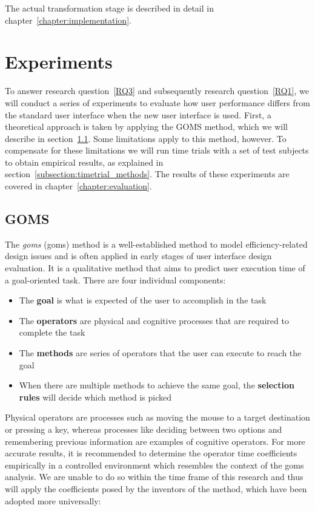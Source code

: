 The actual transformation stage is described in detail in chapter~\ref{chapter:implementation}.

\section{Experiments}
\label{section:experiments_methods}
To answer research question~\ref{RQ3} and subsequently research question~\ref{RQ1}, we will conduct a series of experiments to evaluate how user performance differs from the standard user interface when the new user interface is used. First, a theoretical approach is taken by applying the GOMS method, which we will describe in section~\ref{subsection:goms_methods}. Some limitations apply to this method, however. To compensate for these limitations we will run time trials with a set of test subjects to obtain empirical results, as explained in section~\ref{subsection:timetrial_methods}. The results of these experiments are covered in chapter~\ref{chapter:evaluation}.

\subsection{GOMS}
\label{subsection:goms_methods}
The \textit{\acrlong{goms}} (\acrshort{goms}) method is a well-established method to model efficiency-related design issues and is often applied in early stages of user interface design evaluation\cite{schrepp1990goms, john1996goms, kieras1994goms}. It is a qualitative method that aims to predict user execution time of a goal-oriented task. There are four individual components:

\begin{itemize}
	\item The \textbf{goal} is what is expected of the user to accomplish in the task
	\item The \textbf{operators} are physical and cognitive processes that are required to complete the task
	\item The \textbf{methods} are series of operators that the user can execute to reach the goal
	\item When there are multiple methods to achieve the same goal, the \textbf{selection rules} will decide which method is picked
\end{itemize}

Physical operators are processes such as moving the mouse to a target destination or pressing a key, whereas processes like deciding between two options and remembering previous information are examples of cognitive operators. For more accurate results, it is recommended to determine the operator time coefficients empirically in a controlled environment which resembles the context of the \acrshort{goms} analysis\cite{gong1994validation}. We are unable to do so within the time frame of this research and thus will apply the coefficients posed by the inventors of the method, which have been adopted more universally\cite{kieras2001using}:

